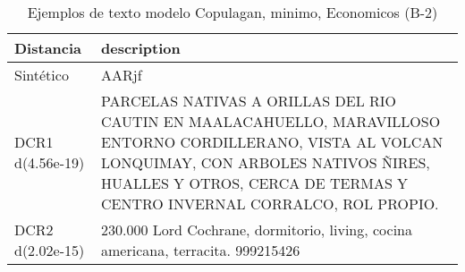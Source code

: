 \begin{table}[H]
\centering
\fontsize{10}{14}\selectfont
\caption{Ejemplos de texto modelo Copulagan, minimo, Economicos (B-2)}
\label{table-example-economicos-b-2-copulagan-min-text}
\begin{tabular}{|l|m{35em}|}
\hline
\rowcolor[gray]{0.8}
Distancia & description \\
\hline Sintético & AARjf \\
\hline DCR1 d(4.56e-19) & PARCELAS NATIVAS A ORILLAS DEL RIO CAUTIN EN MAALACAHUELLO, MARAVILLOSO ENTORNO CORDILLERANO, VISTA AL VOLCAN LONQUIMAY, CON ARBOLES NATIVOS \~NIRES, HUALLES Y OTROS, CERCA DE TERMAS Y CENTRO INVERNAL CORRALCO, ROL PROPIO. \\
\hline DCR2 d(2.02e-15) & 230.000 Lord Cochrane, dormitorio, living, cocina americana, terracita. 999215426 \\
\hline
\end{tabular}
\end{table}
